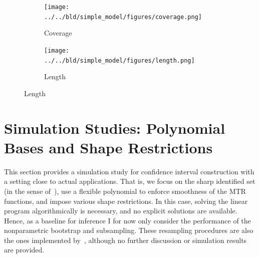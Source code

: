 \documentclass[12pt,a4paper,english]{article} %
\numberwithin{equation}{section}
\theoremstyle{definition}
\theoremstyle{remark}
\theoremstyle{plain}
\begin{document}


\begin{figure}

  \caption{Monte Carlo Simulation: Simple Kink Example}\label{fig:sims_simple_model}

  \centering
  \begin{subfigure}[b]{0.49\textwidth}
      \centering
      \texttt{[image: ../../bld/simple\_model/figures/coverage.png]}
      \caption{Coverage}\label{fig:sims_simple_model_coverage}
  \end{subfigure}
  \hfill
  \begin{subfigure}[b]{0.49\textwidth}
      \centering
      \texttt{[image: ../../bld/simple\_model/figures/length.png]}
      \caption{Length}\label{fig:sims_simple_model_length}
  \end{subfigure}



\end{figure}

\section{Simulation Studies: Polynomial Bases and Shape Restrictions}\label{sec:simulation_studies}
This section provides a simulation study for confidence interval construction with a setting close to actual applications.
That is, we focus on the sharp identified set (in the sense of~\cite{mogstad2018using}), use a flexible polynomial to enforce smoothness of the MTR functions, and impose various shape restrictions.
In this case, solving the linear program algorithmically is necessary, and no explicit solutions are available.
Hence, as a baseline for inference I for now only consider the performance of the nonparametric bootstrap and subsampling.
These resampling procedures are also the ones implemented by~\cite{shea2023ivmte}, although no further discussion or simulation results are provided.
\end{document}
